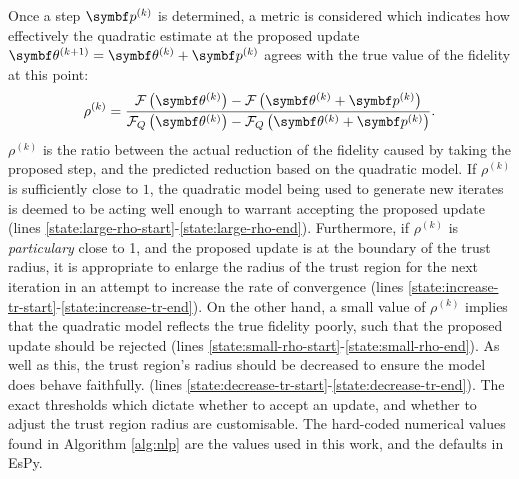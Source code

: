Once a step $\bpk$ is determined, a metric is considered which indicates how
effectively the quadratic estimate at the proposed update $\bthkplusone = \bthk
+ \bpk$ agrees with the true value of the fidelity at this point:
\begin{equation}
    \rho^{(k)} = \frac
        {\Fthk - \Fthkpk}
        {\FQthk - \FQthkpk}.
\end{equation}
$\rho^{(k)}$ is the ratio between the actual reduction of the fidelity caused
by taking the proposed step, and the predicted reduction based on the quadratic
model. If $\rho^{(k)}$ is sufficiently close to $1$, the quadratic model being
used to generate new iterates is deemed to be acting well enough to warrant
accepting the proposed update
(lines \ref{state:large-rho-start}-\ref{state:large-rho-end}).
Furthermore, if $\rho^{(k)}$ is \emph{particulary} close to 1, and the proposed
update is at the boundary of the trust radius, it is appropriate to enlarge the
radius of the trust region for the next iteration in an attempt to increase the
rate of convergence
(lines \ref{state:increase-tr-start}-\ref{state:increase-tr-end}).
On the other hand, a small value of $\rho^{(k)}$ implies that the
quadratic model reflects the true fidelity poorly, such that the proposed
update should be rejected
(lines \ref{state:small-rho-start}-\ref{state:small-rho-end}).
As well as this, the trust region's radius should be
decreased to ensure the model does behave faithfully.
(lines \ref{state:decrease-tr-start}-\ref{state:decrease-tr-end}). The exact
thresholds which dictate whether to accept an update, and whether to adjust the
trust region radius are customisable. The hard-coded numerical values found in
Algorithm \ref{alg:nlp} are the values used in this work, and the defaults in
\ac{EsPy}.

